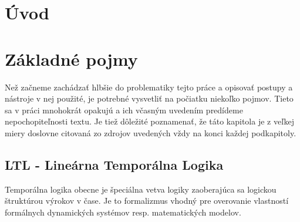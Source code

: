 \documentclass[11pt,final,oneside]{fithesis}
\begin{document}
\MainMatter
\tableofcontents
\chapter*{\' Uvod}


\chapter{Z\' akladn\' e pojmy}
Ne\v z za\v cneme zach\' adza\v t hlb\v sie do problematiky tejto pr\' ace a opisova\v t postupy a n\' astroje v nej pou\v zit\' e, 
je potrebn\' e vysvetli\v t na po\v ciatku nieko\v lko pojmov. Tieto sa v pr\' aci mnohokr\' at opakuj\' u a ich v\v casn\' ym uveden\' im
pred\' ideme nepochopite\v lnosti textu. Je tie\v z d\^ ole\v zit\'e poznamena\v t, \v ze t\'ato kapitola je z ve\v lkej miery doslovne citovan\'a
zo zdrojov uveden\'ych v\v zdy na konci ka\v zdej podkapitoly.

\section{LTL - Line\' arna Tempor\' alna Logika}
\label{sec:logika}
Tempor\' alna logika obecne je \v speci\' alna vetva logiky zaoberaj\' uca sa logickou \v strukt\' urou v\' yrokov v \v case. 
Je to formalizmus vhodn\' y pre overovanie vlastnost\' i form\' alnych dynamick\' ych syst\' emov resp. matematick\' ych modelov.
\end{document}
